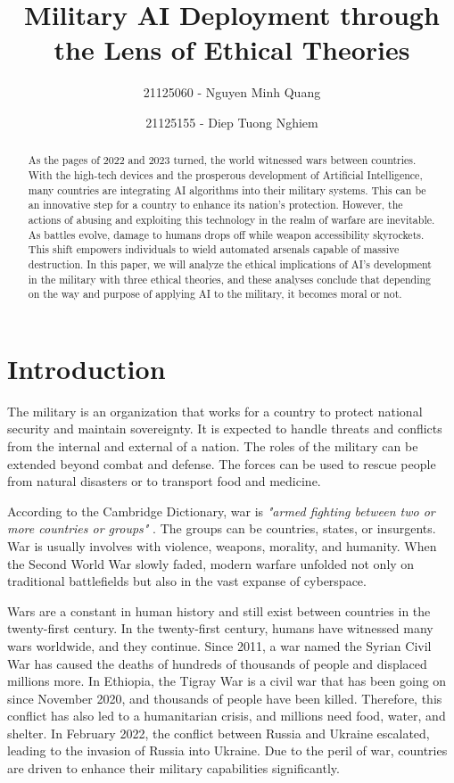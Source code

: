 \documentclass[12pt]{article}
\title{Military AI Deployment through the Lens of \break  Ethical Theories}
\author[1,*]{21125060 - Nguyen Minh Quang}
\author[2,*]{21125155 - Diep Tuong Nghiem}
\affil[*]{VNUHCM - University of Science}
\affil[1]{nmquang21@apcs.fitus.edu.vn}
\affil[2]{dtnghiem21@apcs.fitus.edu.vn}
\date{}
\begin{document}
\maketitle

\begin{abstract}
As the pages of 2022 and 2023 turned, the world witnessed wars between countries. With the high-tech devices and the prosperous development of Artificial Intelligence, many countries are integrating AI algorithms into their military systems. This can be an innovative step for a country to enhance its nation's protection. However, the actions of abusing and exploiting this technology in the realm of warfare are inevitable. As battles evolve, damage to humans drops off while weapon accessibility skyrockets. This shift empowers individuals to wield automated arsenals capable of massive destruction. In this paper, we will analyze the ethical implications of AI's development in the military with three ethical theories, and these analyses conclude that depending on the way and purpose of applying AI to the military, it becomes moral or not.
\end{abstract}

\section{Introduction}
The military is an organization that works for a country to protect national security and maintain sovereignty. It is expected to handle threats and conflicts from the internal and external of a nation. The roles of the military can be extended beyond combat and defense. The forces can be used to rescue people from natural disasters or to transport food and medicine.

According to the Cambridge Dictionary, war is \textit{"armed fighting between two or more countries or groups"} \cite{war-def-cambridge}. The groups can be countries, states, or insurgents. War is usually involves with violence, weapons, morality, and humanity. When the Second World War slowly faded, modern warfare unfolded not only on traditional battlefields but also in the vast expanse of cyberspace.

Wars are a constant in human history and still exist between countries in the twenty-first century. In the twenty-first century, humans have witnessed many wars worldwide, and they continue. Since 2011, a war named the Syrian Civil War has caused the deaths of hundreds of thousands of people and displaced millions more. In Ethiopia, the Tigray War is a civil war that has been going on since November 2020, and thousands of people have been killed. Therefore, this conflict has also led to a humanitarian crisis, and millions need food, water, and shelter. In February 2022, the conflict between Russia and Ukraine escalated, leading to the invasion of Russia into Ukraine. Due to the peril of war, countries are driven to enhance their military capabilities significantly.
\end{document}
